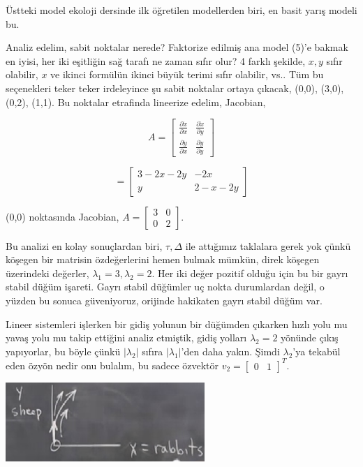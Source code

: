 \documentclass[12pt,fleqn]{article}\usepackage{../../common}
\begin{document}
Üstteki model ekoloji dersinde ilk öğretilen modellerden biri, en basit yarış
modeli bu.

Analiz edelim, sabit noktalar nerede? Faktorize edilmiş ana model (5)'e bakmak
en iyisi, her iki eşitliğin sağ tarafı ne zaman sıfır olur? 4 farklı şekilde,
$x,y$ sıfır olabilir, $x$ ve ikinci formülün ikinci büyük terimi sıfır olabilir,
vs.. Tüm bu seçenekleri teker teker irdeleyince şu sabit noktalar ortaya
çıkacak, (0,0), (3,0), (0,2), (1,1). Bu noktalar etrafinda lineerize edelim,
Jacobian,

$$
A =
\left[\begin{array}{rr}
\frac{\partial \dot{x}}{\partial x} & \frac{\partial \dot{x}}{\partial y} \\
\frac{\partial \dot{y}}{\partial x} & \frac{\partial \dot{y}}{\partial y} 
\end{array}\right]
$$

$$
= \left[\begin{array}{rr}
3-2x-2y & -2x \\
y & 2-x-2y
\end{array}\right]
$$

(0,0) noktasında Jacobian, $A = \left[\begin{array}{rr} 3 & 0 \\ 0 & 2\end{array}\right]$.

Bu analizi en kolay sonuçlardan biri, $\tau,\Delta$ ile attığımız taklalara
gerek yok çünkü köşegen bir matrisin özdeğerlerini hemen bulmak mümkün, direk
köşegen üzerindeki değerler, $\lambda_1=3,\lambda_2=2$. Her iki değer pozitif
olduğu için bu bir gayrı stabil düğüm işareti. Gayrı stabil düğümler uç nokta
durumlardan değil, o yüzden bu sonuca güveniyoruz, orijinde hakikaten gayrı
stabil düğüm var.

Lineer sistemleri işlerken bir gidiş yolunun bir düğümden çıkarken hızlı yolu mu
yavaş yolu mu takip ettiğini analiz etmiştik, gidiş yolları $\lambda_2 = 2$
yönünde çıkış yapıyorlar, bu böyle çünkü $|\lambda_2|$ sıfıra $|\lambda_1|$'den
daha yakın. Şimdi $\lambda_2$'ya tekabül eden özyön nedir onu bulalım, bu sadece
özvektör $v_2 = \left[\begin{array}{cc} 0 & 1 \end{array}\right]^T$. 

\includegraphics[height=3cm]{06_07.png}
\end{document}
